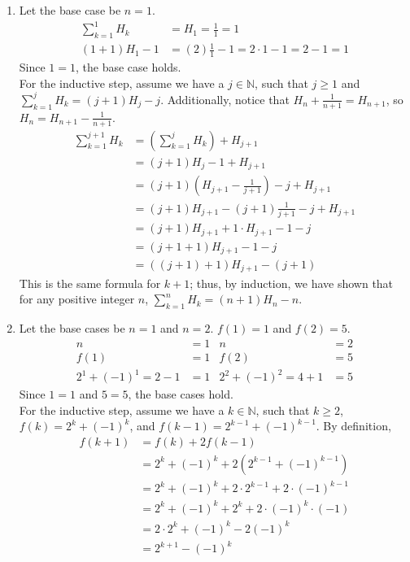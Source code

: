 \documentclass{article}
\begin{document}
\begin{enumerate}[label=\textbf{\arabic*}.]
    \item Let the base case be $n=1$.
    \begin{align}
        \sum_{k=1}^{1}H_k&=H_1=\frac{1}{1}=1\\
        (1+1)H_1-1&=(2)\frac{1}{1}-1=2\cdot1-1=2-1=1
    \end{align}
    Since $1=1$, the base case holds.\\
    For the inductive step, assume we have a $j\in\mathbb{N}$, such that $j\geq1$ and $\sum_{k=1}^{j}H_k=(j+1)H_j-j$. Additionally, notice that $H_n+\frac{1}{n+1}=H_{n+1}$, so $H_n=H_{n+1}-\frac{1}{n+1}$.
    \begin{align*}
    \sum_{k=1}^{j+1}H_k &=(\sum_{k=1}^{j}H_k)+H_{j+1}\\
    &=(j+1)H_j-1+H_{j+1}\\
    &=(j+1)(H_{j+1}-\frac{1}{j+1})-j+H_{j+1}\\
    &=(j+1)H_{j+1}-(j+1)\frac{1}{j+1}-j+H_{j+1}\\
    &=(j+1)H_{j+1}+1\cdot H_{j+1}-1-j\\
    &=(j+1+1)H_{j+1}-1-j\\
    &=((j+1)+1)H_{j+1}-(j+1)
    \end{align*}
    This is the same formula for $k+1$; thus, by induction, we have shown that for any positive integer $n$, $\sum_{k=1}^{n}H_k=(n+1)H_n-n$.
    \item Let the base cases be $n=1$ and $n=2$. $f(1)=1$ and $f(2)=5$.
    \begin{align*}
        n&=1 & n&=2\\
        f(1)&=1 & f(2)&=5\\
        2^1+(-1)^1=2-1&=1 & 2^2+(-1)^2=4+1&=5
    \end{align*}
    Since $1=1$ and $5=5$, the base cases hold.\\
    For the inductive step, assume we have a $k\in\mathbb{N}$, such that $k\geq2$, $f(k)=2^k+(-1)^k$, and $f(k-1)=2^{k-1}+(-1)^{k-1}$. By definition,
    \begin{align*}
        f(k+1)&=f(k)+2f(k-1)\\
        &=2^k+(-1)^k+2(2^{k-1}+(-1)^{k-1})\\
        &=2^k+(-1)^k+2\cdot2^{k-1}+2\cdot(-1)^{k-1}\\
        &=2^k+(-1)^k+2^{k}+2\cdot(-1)^{k}\cdot(-1)\\
        &=2\cdot2^k+(-1)^k-2(-1)^{k}\\
        &=2^{k+1}-(-1)^{k}\\

\end{align*}
\end{enumerate}
\end{document}
